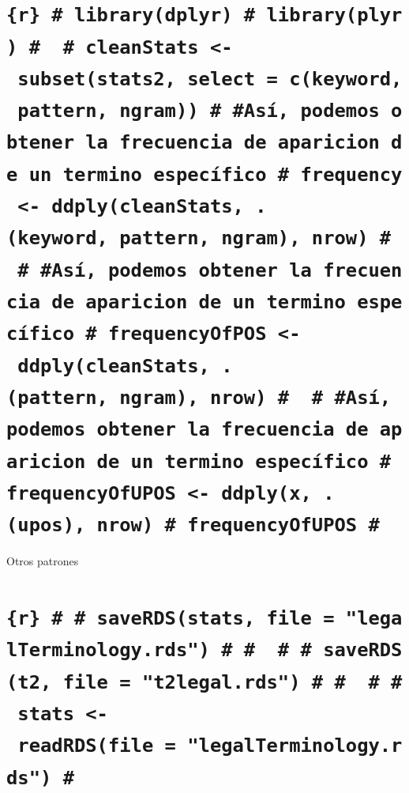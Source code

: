 \documentclass[]{article}
\begin{document}
\hypertarget{r-librarydplyr-libraryplyr-cleanstats---subsetstats2-select-ckeyword-pattern-ngram-asuxed-podemos-obtener-la-frecuencia-de-aparicion-de-un-termino-especuxedfico-frequency---ddplycleanstats-.keyword-pattern-ngram-nrow-asuxed-podemos-obtener-la-frecuencia-de-aparicion-de-un-termino-especuxedfico-frequencyofpos---ddplycleanstats-.pattern-ngram-nrow-asuxed-podemos-obtener-la-frecuencia-de-aparicion-de-un-termino-especuxedfico-frequencyofupos---ddplyx-.upos-nrow-frequencyofupos}{%
\section{\texorpdfstring{\texttt{\{r\}\ \#\ library(dplyr)\ \#\ library(plyr)\ \#\ \ \#\ cleanStats\ \textless{}-\ subset(stats2,\ select\ =\ c(keyword,\ pattern,\ ngram))\ \#\ \#Así,\ podemos\ obtener\ la\ frecuencia\ de\ aparicion\ de\ un\ termino\ específico\ \#\ frequency\ \textless{}-\ ddply(cleanStats,\ .(keyword,\ pattern,\ ngram),\ nrow)\ \#\ \ \#\ \#Así,\ podemos\ obtener\ la\ frecuencia\ de\ aparicion\ de\ un\ termino\ específico\ \#\ frequencyOfPOS\ \textless{}-\ ddply(cleanStats,\ .(pattern,\ ngram),\ nrow)\ \#\ \ \#\ \#Así,\ podemos\ obtener\ la\ frecuencia\ de\ aparicion\ de\ un\ termino\ específico\ \#\ frequencyOfUPOS\ \textless{}-\ ddply(x,\ .(upos),\ nrow)\ \#\ frequencyOfUPOS\ \#}}{\{r\} \# library(dplyr) \# library(plyr) \#  \# cleanStats \textless{}- subset(stats2, select = c(keyword, pattern, ngram)) \# \#Así, podemos obtener la frecuencia de aparicion de un termino específico \# frequency \textless{}- ddply(cleanStats, .(keyword, pattern, ngram), nrow) \#  \# \#Así, podemos obtener la frecuencia de aparicion de un termino específico \# frequencyOfPOS \textless{}- ddply(cleanStats, .(pattern, ngram), nrow) \#  \# \#Así, podemos obtener la frecuencia de aparicion de un termino específico \# frequencyOfUPOS \textless{}- ddply(x, .(upos), nrow) \# frequencyOfUPOS \#}}\label{r-librarydplyr-libraryplyr-cleanstats---subsetstats2-select-ckeyword-pattern-ngram-asuxed-podemos-obtener-la-frecuencia-de-aparicion-de-un-termino-especuxedfico-frequency---ddplycleanstats-.keyword-pattern-ngram-nrow-asuxed-podemos-obtener-la-frecuencia-de-aparicion-de-un-termino-especuxedfico-frequencyofpos---ddplycleanstats-.pattern-ngram-nrow-asuxed-podemos-obtener-la-frecuencia-de-aparicion-de-un-termino-especuxedfico-frequencyofupos---ddplyx-.upos-nrow-frequencyofupos}}

Otros patrones

\hypertarget{r-saverdsstats-file-legalterminology.rds-saverdst2-file-t2legal.rds-stats---readrdsfile-legalterminology.rds}{%
\section{\texorpdfstring{\texttt{\{r\}\ \#\ \#\ saveRDS(stats,\ file\ =\ "legalTerminology.rds")\ \#\ \#\ \ \#\ \#\ saveRDS(t2,\ file\ =\ "t2legal.rds")\ \#\ \#\ \ \#\ \#\ stats\ \textless{}-\ readRDS(file\ =\ "legalTerminology.rds")\ \#}}{\{r\} \# \# saveRDS(stats, file = "legalTerminology.rds") \# \#  \# \# saveRDS(t2, file = "t2legal.rds") \# \#  \# \# stats \textless{}- readRDS(file = "legalTerminology.rds") \#}}\label{r-saverdsstats-file-legalterminology.rds-saverdst2-file-t2legal.rds-stats---readrdsfile-legalterminology.rds}}
\end{document}
